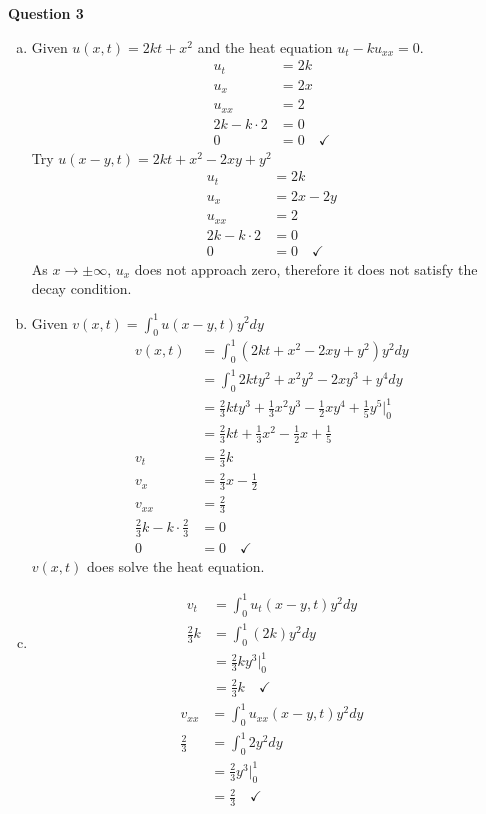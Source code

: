\documentclass[12pt, letterpaper]{article}
\begin{document}
\noindent \textbf{Question 3} 
\begin{enumerate}[(a)]
    \item Given $u(x,t) = 2kt + x^2$ and the heat equation $u_t -ku_{xx} = 0$.
    \begin{align*}
        u_t &= 2k \\
        u_x &= 2x \\
        u_{xx} &= 2 \\
        2k - k\cdot 2 &= 0 \\
        0&=0\quad \checkmark 
    \end{align*}
    Try $u(x-y,t) = 2kt + x^2 -2xy + y^2$ 
    \begin{align*}
        u_t &= 2k \\
        u_x &= 2x - 2y \\
        u_{xx} &= 2 \\
        2k - k\cdot 2 &= 0 \\
        0 &= 0 \quad \checkmark
    \end{align*}
    As $x \rightarrow \pm \infty$, $u_x$ does not approach zero, therefore
    it does not satisfy the decay condition.
    \item Given $v(x,t) = \int_{0}^{1}u(x-y,t)y^2dy$
    \begin{align*}
        v(x,t) &= \int_{0}^{1}(2kt+x^2-2xy+y^2)y^2 dy \\
        &=\int_{0}^{1} 2kty^2 + x^2y^2 - 2xy^3 + y^4 dy \\
        &=\frac 23 kty^3 + \frac 13 x^2y^3 - \frac 12 xy^4 + \frac 15 y^5 \Big|_0^1 \\
        &= \frac 23 kt + \frac 13 x^2 - \frac 12 x + \frac 15 \\
        v_t &= \frac 23 k \\
        v_x &= \frac 23 x - \frac 12 \\
        v_{xx} &= \frac 23 \\
        \frac 23 k - k\cdot \frac 23 &= 0 \\
        0 &= 0 \quad \checkmark
    \end{align*}
    $v(x,t)$ does solve the heat equation.
    \item 
    \begin{align*}
        v_t &= \int_{0}^{1}u_t(x-y,t)y^2 dy \\
        \frac 23 k &= \int_{0}^{1}(2k)y^2 dy \\
        &= \frac 23 ky^3 \Big|_0^1 \\
        &= \frac 23 k \quad \checkmark
    \end{align*}
    \begin{align*}
        v_{xx} &= \int_{0}^{1}u_{xx}(x-y,t)y^2 dy \\
        \frac 23 &= \int_{0}^{1}2y^2 dy \\
        &= \frac 23 y^3 \Big|_0^1 \\
        &= \frac 23 \quad \checkmark
    \end{align*}
\end{enumerate}
\end{document}
